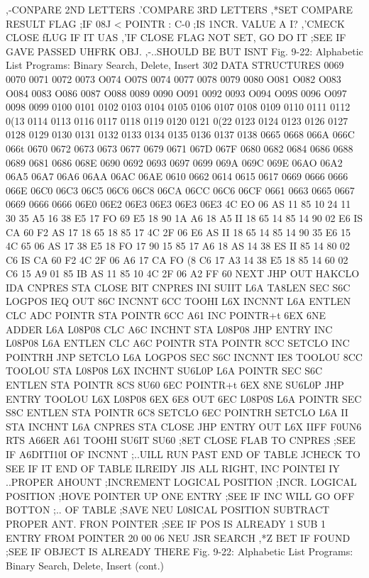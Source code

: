 \documentclass{book}
\begin{document}
{{{{{{{{{,-CONPARE 2ND LETTERS
.'COMPARE 3RD LETTERS
,*SET COMPARE RESULT FLAG
;IF 08J < POINTR : C-0
;IS 1NCR. VALUE A I?
,'CMECK CLOSE fLUG IF IT UAS
,'IF CLOSE FLAG NOT SET, GO DO IT
;SEE IF GAVE PASSED UHFRK OBJ.
,-..SHOULD BE BUT ISNT
Fig. 9-22: Alphabetic List Programs: Binary Search, Delete, Insert
302
DATA STRUCTURES
0069
0070
0071
0072
0073
O074
O07S
0074
0077
0078
0079
0080
O081
O082
O083
O084
0083
O086
0087
O088
0089
0090
O091
0092
0093
O094
O09S
0096
O097
0098
0099
0100
0101
0102
0103
0104
0105
0106
0107
0108
0109
0110
0111
0112
0(13
0114
0113
0116
0117
0118
0119
0120
0121
0(22
0123
0124
0123
0126
0127
0128
0129
0130
0131
0132
0133
0134
0135
0136
0137
0138
0665
0668
066A
066C
066t
0670
0672
0673
0673
0677
0679
0671
067D
067F
0680
0682
0684
0686
0688
0689
0681
0686
068E
0690
0692
0693
0697
0699
069A
069C
069E
06AO
06A2
06A5
06A7
06A6
06AA
06AC
06AE
0610
0662
0614
0615
0617
0669
0666
0666
066E
06C0
06C3
06C5
06C6
06C8
06CA
06CC
06C6
06CF
0661
0663
0665
0667
0669
0666
0666
06E0
06E2
06E3
06E3
06E3
06E3
4C EO 06
AS 11
85 10
24 11
30 35
A5 16
38
E5 17
FO 69
E5 18
90 1A
A6 18
A5 II
18
65 14
85 14
90 02
E6 IS
CA
60 F2
AS 17
18
65 18
85 17
4C 2F 06
E6 \7
AS II
18
65 14
85 14
90 35
E6 15
4C 65 06
AS 17
38
E5 18
FO 17
90 15
85 17
A6 18
AS 14
38
ES II
85 14
80 02
C6 IS
CA
60 F2
4C 2F 06
A6 17
CA
FO (8
C6 17
A3 14
38
E5 18
85 14
60 02
C6 15
A9 01
85 IB
AS 11
85 10
4C 2F 06
A2 FF
60
NEXT
JHP OUT
HAKCLO IDA CNPRES
STA CLOSE
BIT CNPRES
INI SUIIT
L6A TA8LEN
SEC
S6C LOGPOS
IEQ OUT
86C INCNNT
6CC TOOHI
L6X INCNNT
L6A ENTLEN
CLC
ADC POINTR
STA POINTR
6CC A61
INC POINTR+t
6EX
6NE ADDER
L6A L08P08
CLC
A6C INCHNT
STA L08P08
JHP ENTRY
INC L08P08
L6A ENTLEN
CLC
A6C POINTR
STA POINTR
8CC SETCLO
INC POINTRH
JNP SETCLO
L6A LOGPOS
SEC
S6C INCNNT
IE8 TOOLOU
8CC TOOLOU
STA L08P08
L6X INCHNT
SU6L0P L6A POINTR
SEC
S6C ENTLEN
STA POINTR
8CS 8U60
6EC POINTR+t
6EX
8NE SU6L0P
JHP ENTRY
TOOLOU L6X L08P08
6EX
6E8 OUT
6EC L08P0S
L6A POINTR
SEC
S8C ENTLEN
STA POINTR
6C8 SETCLO
6EC POINTRH
SETCLO L6A II
STA INCHNT
L6A CNPRES
STA CLOSE
JHP ENTRY
OUT L6X IIFF
F0UN6 RTS
A66ER
A61
TOOHI
SU6IT
SU60
;8ET CLOSE FLAB TO CNPRES
;SEE IF A6DITI10I OF INCNNT
;..UILL RUN PAST END OF TABLE
JCHECK TO SEE IF IT END OF TABLE ILREIDY
JIS ALL RIGHT, INC POINTEI IY
{..PROPER AHOUNT
;INCREMENT LOGICAL POSITION
;INCR. LOGICAL POSITION
;HOVE POINTER UP ONE ENTRY
;SEE IF INC WILL GO OFF BOTTON
;.. OF TABLE
;SAVE NEU L08ICAL POSITION
{SUBTRACT PROPER ANT. FRON POINTER
;SEE IF POS IS ALREADY 1
}SUB 1 ENTRY FROM POINTER
20 00 06 NEU JSR SEARCH
,*Z BET IF FOUND
;SEE IF OBJECT IS ALREADY THERE
Fig. 9-22: Alphabetic List Programs: Binary Search, Delete, Insert (cont.)
}}}}}}}}}}
\end{document}
